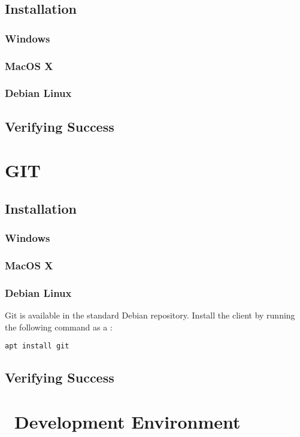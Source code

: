 \subsection{Installation}
\subsubsection{Windows}
\subsubsection{MacOS X}
\subsubsection{Debian Linux}
\subsection{Verifying Success}

\section{GIT}

\subsection{Installation}
\subsubsection{Windows}
\subsubsection{MacOS X}
\subsubsection{Debian Linux}

Git is available in the standard Debian repository. Install the client by running the following command as a :

\begin{verbatim}
apt install git
\end{verbatim}

\subsection{Verifying Success}

\section{\csharp\ Development Environment}


